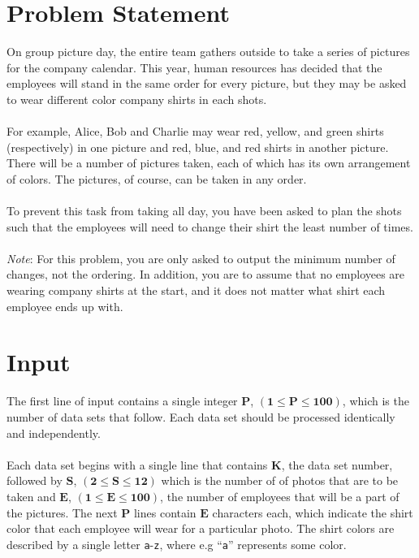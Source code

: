 \documentclass[11pt]{article}
\begin{document}
\pagestyle{fancy}


\section{Problem Statement}
On group picture day, the entire team gathers outside to take a series of
pictures for the company calendar. This year, human resources has decided
that the employees will stand in the same order for every picture, but they
may be asked to wear different color company shirts in each shots.
\\\\
For example, Alice, Bob and Charlie may wear red, yellow, and green shirts
(respectively) in one picture and red, blue, and red shirts in another picture.
There will be a number of pictures taken, each of which has its own arrangement
of colors. The pictures, of course, can be taken in any order.
\\\\
To prevent this task from taking all day, you have been asked to plan the shots
such that the employees will need to change their shirt the least number of times.
\\\\
\emph{Note}: For this problem, you are only asked to output the minimum number of changes,
not the ordering. In addition, you are to assume that no employees are wearing company
shirts at the start, and it does not matter what shirt each employee ends up with.

\section{Input}
The first line of input contains a single integer $\boldsymbol{P}$, $(\boldsymbol{1} \le \boldsymbol{P} \le \boldsymbol{100})$, which is the number of data sets that follow. Each
data set should be processed identically and independently.
\\\\
Each data set begins with a single line that contains $\boldsymbol{K}$, the data
set number, followed by $\boldsymbol{S}$, $(\boldsymbol{2} \le \boldsymbol{S} \le \boldsymbol{12})$
which is the number of of photos that are to be taken and  $\boldsymbol{E}$,
$(\boldsymbol{1} \le \boldsymbol{E} \le \boldsymbol{100})$, the number of employees
that will be a part of the pictures. The next $\boldsymbol{P}$ lines contain $\boldsymbol{E}$
characters each, which indicate the shirt color that each employee will wear for a
particular photo. The shirt colors are described by a single letter \texttt{a}-\texttt{z},
where e.g ``\texttt{a}'' represents some color.
\end{document}
